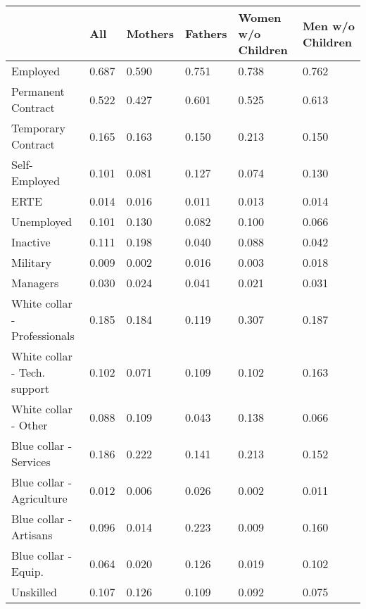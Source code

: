 \begin{tabular}{llllll}
\toprule
{} &     All & Mothers & Fathers & Women w/o Children & Men w/o Children \\
\midrule
Employed                     &   0.687 &   0.590 &   0.751 &              0.738 &            0.762 \\
Permanent Contract           &   0.522 &   0.427 &   0.601 &              0.525 &            0.613 \\
Temporary Contract           &   0.165 &   0.163 &   0.150 &              0.213 &            0.150 \\
Self-Employed                &   0.101 &   0.081 &   0.127 &              0.074 &            0.130 \\
ERTE                         &   0.014 &   0.016 &   0.011 &              0.013 &            0.014 \\
Unemployed                   &   0.101 &   0.130 &   0.082 &              0.100 &            0.066 \\
Inactive                     &   0.111 &   0.198 &   0.040 &              0.088 &            0.042 \\
Military                     &   0.009 &   0.002 &   0.016 &              0.003 &            0.018 \\
Managers                     &   0.030 &   0.024 &   0.041 &              0.021 &            0.031 \\
White collar - Professionals &   0.185 &   0.184 &   0.119 &              0.307 &            0.187 \\
White collar - Tech. support &   0.102 &   0.071 &   0.109 &              0.102 &            0.163 \\
White collar - Other         &   0.088 &   0.109 &   0.043 &              0.138 &            0.066 \\
Blue collar - Services       &   0.186 &   0.222 &   0.141 &              0.213 &            0.152 \\
Blue collar - Agriculture    &   0.012 &   0.006 &   0.026 &              0.002 &            0.011 \\
Blue collar - Artisans       &   0.096 &   0.014 &   0.223 &              0.009 &            0.160 \\
Blue collar - Equip.         &   0.064 &   0.020 &   0.126 &              0.019 &            0.102 \\
Unskilled                    &   0.107 &   0.126 &   0.109 &              0.092 &            0.075 \\

\end{tabular}
